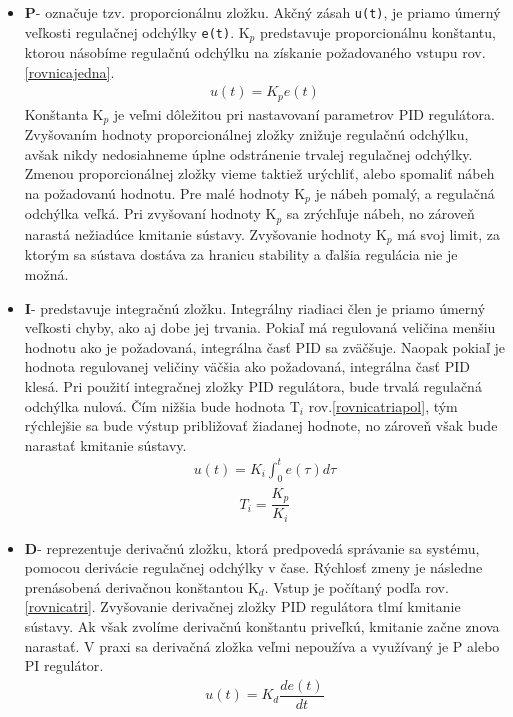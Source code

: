 \begin{itemize}
	\item \textbf{P}- označuje tzv. proporcionálnu zložku. Akčný zásah \verb|u(t)|, je priamo úmerný veľkosti regulačnej odchýlky \verb|e(t)|. K$_p$ predstavuje proporcionálnu konštantu, ktorou násobíme regulačnú odchýlku na získanie požadovaného vstupu rov.\ref{rovnicajedna}. 
	\begin{align}
		\label{rovnicajedna}
		u(t)=K_p e(t)
	\end{align}
	Konštanta K$_p$ je veľmi dôležitou pri nastavovaní parametrov PID regulátora. Zvyšovaním hodnoty proporcionálnej zložky znižuje regulačnú odchýlku, avšak nikdy nedosiahneme úplne odstránenie trvalej regulačnej odchýlky. Zmenou proporcionálnej zložky vieme taktiež urýchliť, alebo spomaliť nábeh na požadovanú hodnotu. Pre malé hodnoty K$_p$ je nábeh pomalý, a regulačná odchýlka veľká. Pri zvyšovaní hodnoty K$_p$ sa zrýchľuje nábeh, no zároveň narastá nežiadúce kmitanie sústavy. Zvyšovanie hodnoty K$_p$ má svoj limit, za ktorým sa sústava dostáva za hranicu stability a ďalšia regulácia nie je možná. 
	
	\item \textbf{I}- predstavuje integračnú zložku. Integrálny riadiaci člen je priamo úmerný veľkosti chyby, ako aj dobe jej trvania. Pokiaľ má regulovaná veličina menšiu hodnotu ako je požadovaná, integrálna časť PID sa zväčšuje. Naopak pokiaľ je hodnota regulovanej veličiny väčšia ako požadovaná, integrálna časť PID klesá. Pri použití integračnej zložky PID regulátora, bude trvalá regulačná odchýlka nulová\cite{PIDcko}. Čím nižšia bude hodnota T$_i$ rov.\ref{rovnicatriapol}, tým rýchlejšie sa bude výstup približovať žiadanej hodnote, no zároveň však bude narastať kmitanie sústavy.   
	\begin{align}
		\label{rovnicadva}
		u(t)=K_i  \int_{0}^{t} e(\tau)d\tau  
	\end{align}
	\begin{align}
	\label{rovnicatriapol}
        T_i = \dfrac{K_p}{K_i}
    \end{align}
	
	\item \textbf{D}- reprezentuje derivačnú zložku, ktorá predpovedá správanie sa systému, pomocou derivácie regulačnej odchýlky v čase. Rýchlosť zmeny je následne prenásobená derivačnou konštantou K$_d$. Vstup je počítaný podľa rov.\ref{rovnicatri}. Zvyšovanie derivačnej zložky PID regulátora tlmí kmitanie sústavy. Ak však zvolíme derivačnú konštantu priveľkú, kmitanie začne znova narastať\cite{PIDcko}. V praxi sa derivačná zložka veľmi nepoužíva a využívaný je P alebo PI regulátor\cite{1453566}. 
	\begin{align}
		\label{rovnicatri}
		u(t)=K_d  \dfrac{de(t)}{dt}
	\end{align}

\end{itemize}

